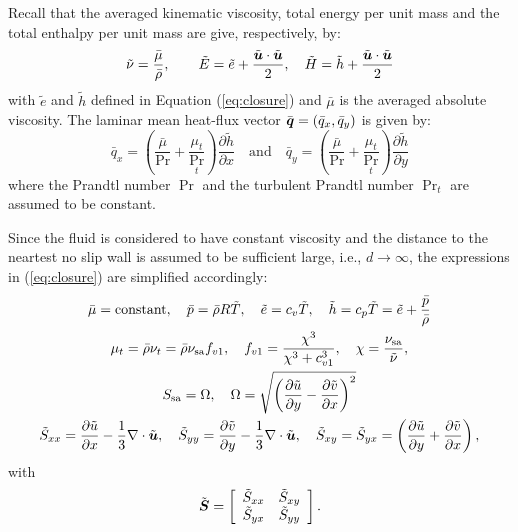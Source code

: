 \documentclass[10pt]{article}
\newcommand{\diff}[2] {\dfrac{\partial #1}{\partial #2}}
\newcommand{\bv}[1]{\ensuremath{\mbox{\boldmath$ #1 $}}}
\newcommand{\sa}{\nu_{\mathrm{sa}}}
\newcommand{\tS}{\tilde{S}}
\newcommand{\bmu}{\bar{\mu}}
\begin{document}
Recall that the averaged kinematic viscosity, total energy per unit mass and the total enthalpy per unit mass are give, respectively, by:
\begin{equation}
 \begin{split}\label{eq:closure01}
  \tilde{\nu}=\dfrac{\bar{\mu}}{\bar{\rho}},\qquad \tilde{E}=\tilde{e}+\dfrac{\tilde{\bv{u}}\cdot \tilde{\bv{u}}}{2}, \quad \tilde{H}=\tilde{h}+\dfrac{\tilde{\bv{u}}\cdot \tilde{\bv{u}}}{2}
 \end{split}
\end{equation}
with $\tilde{e}$ and $\tilde{h}$ defined in Equation (\ref{eq:closure}) and $\bmu$ is the averaged absolute viscosity. The laminar mean heat-flux vector $\bar{\bv{q}}=(\bar{q}_x,\bar{q}_y)$ is given by:
%
\begin{equation}\label{eq:closure02}
 \bar{q}_x = \left(\dfrac{\bar{\mu}}{\Pr}+\dfrac{\mu_t}{\Pr_t}\right)\diff{\tilde{h}}{x}\quad \mbox{and} \quad \bar{q}_y = \left(\dfrac{\bar{\mu}}{\Pr}+\dfrac{\mu_t}{\Pr_t}\right)\diff{\tilde{h}}{y}
 \end{equation}
where the Prandtl number $\Pr$ and the turbulent Prandtl number $\Pr_t$ are assumed to be constant.

Since the fluid is considered to have constant viscosity and the distance to the neartest no slip wall is assumed to be sufficient large, i.e., $d\rightarrow\infty$, the expressions in (\ref{eq:closure}) are simplified accordingly:
\begin{gather}
\label{eq:closure03}
 \bar{\mu} = \text{constant}, \quad \bar{p} = \bar{\rho} R \tilde{T}, \quad \tilde{e} = c_v \tilde{T}, \quad \tilde{h} = c_p \tilde{T} = \tilde{e} + \frac{\bar{p}}{\bar{\rho}} \\
\label{eq:closure04}
\mu_t = \bar{\rho} \nu_t = \bar{\rho} \sa f_{v1}, \quad f_{v1} = \frac{\chi^3}{\chi^3 + c_{v1}^3}, \quad \chi = \frac{\sa}{\tilde{\nu}}, \\
\label{eq:closure05}
S_{\mathrm{sa}} = \Omega, \quad \Omega = \sqrt{\left( \diff{\tilde{u}}{y} - \diff{\tilde{v}}{x}\right)^2} \\
\label{eq:closure06}
\tS_{xx}= \diff{\tilde{u}}{x}-\dfrac{1}{3} \nabla \cdot \tilde{\bv{u}},\quad \tS_{yy}= \diff{\tilde{v}}{y}-\dfrac{1}{3} \nabla \cdot \tilde{\bv{u}}, \quad \tS_{xy}= \tS_{yx}= \left( \diff{\tilde{u}}{y} + \diff{\tilde{v}}{x}\right),
\end{gather}
with
\begin{equation}
\tilde{\bv{S}}=\left[
\begin{array}{cc}
\tS_{xx} & \tS_{xy}\\
\tS_{yx} & \tS_{yy}
\end{array}\right] .
\end{equation}
\end{document}
